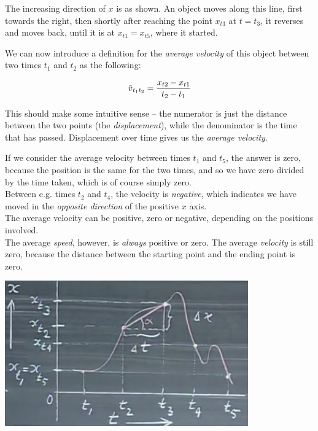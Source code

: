 \documentclass[12pt,a4paper]{report}
\newcommand{\overbar}[1]{\mkern 1.5mu\overline{\mkern-1.5mu#1\mkern-1.5mu}\mkern 1.5mu}
\begin{document}
The increasing direction of $x$ is as shown. An object moves along this line, first towards the right, then shortly after reaching the point $x_{t3}$ at  $t = t_3$, it reverses and moves back, until it is at $x_{t1} = x_{t5}$, where it started.

We can now introduce a definition for the \emph{average velocity} of this object between two times $t_1$ and $t_2$ as the following:

\begingroup
\large
\begin{equation}
 \overbar{v}_{t_1 t_2} = \frac{x_{t2} - x_{t1}}{t_2 - t_1}
\end{equation}
\endgroup

This should make some intuitive sense -- the numerator is just the distance between the two points (the \emph{displacement}), while the denominator is the time that has passed. Displacement over time gives us the \emph{average velocity}.

If we consider the average velocity between times $t_1$ and $t_5$, the answer is zero, because the position is the same for the two times, and so we have zero divided by the time taken, which is of course simply zero.\\
Between e.g. times $t_2$ and $t_4$, the velocity is \emph{negative}, which indicates we have moved in the \emph{opposite direction} of the positive $x$ axis.\\
The average velocity can be positive, zero or negative, depending on the positions involved.\\
The average \emph{speed}, however, is \emph{always} positive or zero. The average \emph{velocity} is still zero, because the distance between the starting point and the ending point is zero.

\begin{center}
\includegraphics[scale=0.75]{Graphics/1d-motion-graph}
\end{center}
\end{document}
